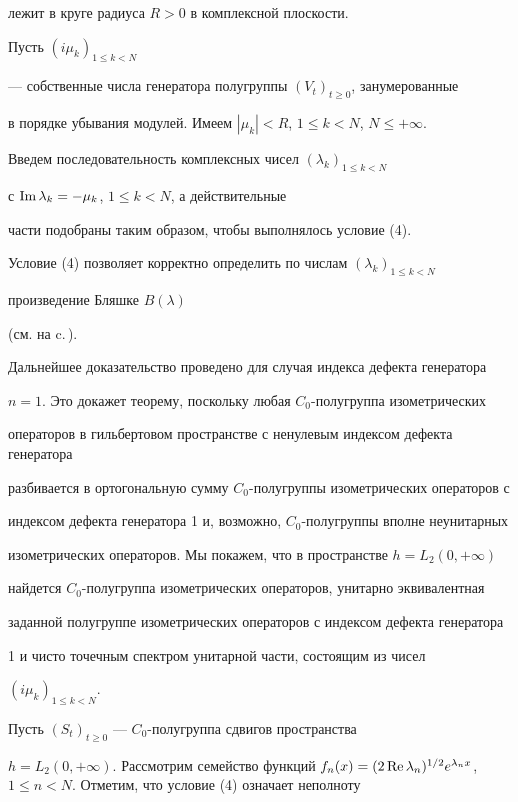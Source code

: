 лежит в круге радиуса $R>0$ в комплексной плоскости.


Пусть $(i\mu_k)_{1\leq k<N}$


--- собственные числа генератора полугруппы $(V_t)_{t\geq 0}$, занумерованные


в порядке убывания модулей. Имеем $|\mu_k|<R$, $1\le k<N$, $N\le+\infty$.


Введем последовательность комплексных чисел $(\lambda_k)_{1\leq k<N}$


с $\operatorname{Im}\lambda_k=-\mu_k$, $1\leq k<N$, а действительные


части подобраны таким образом, чтобы выполнялось условие (4).


Условие (4) позволяет корректно определить по числам $(\lambda_k)_{1\leq k<N}$


произведение Бляшке $B(\lambda)$


(см. на c.\,\pageref{Blashke}).





Дальнейшее доказательство проведено для случая индекса дефекта генератора


$n=1$. Это докажет теорему, поскольку любая $C_0$-полугруппа изометрических


операторов в гильбертовом пространстве с ненулевым индексом дефекта генератора


разбивается в ортогональную сумму $C_0$-полугруппы изометрических операторов с


индексом дефекта генератора 1 и, возможно, $C_0$-полугруппы вполне неунитарных


изометрических операторов. Мы покажем, что в пространстве $h=L_2(0,+\infty)$


найдется $C_0$-полугруппа изометрических операторов, унитарно эквивалентная


заданной полугруппе изометрических операторов с индексом дефекта генератора


1 и чисто точечным спектром унитарной части, состоящим из чисел


$(i\mu_k)_{1\leq k<N}$.





Пусть $(S_t)_{t\geq 0}$ --- $C_0$-полугруппа сдвигов пространства


$h=L_2(0,+\infty)$. Рассмотрим семейство функций $f_n(x)=(2\re\lambda_n)^{1/2}


e^{\lambda_nx}$, $1\leq n<N$. Отметим, что условие (4) означает неполноту


